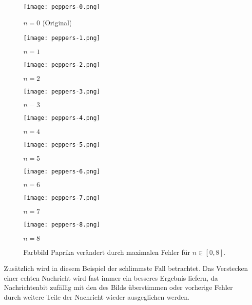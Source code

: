 \begin{figure}[h!]
  \centering
  \begin{minipage}[t]{0.3\textwidth}
    \texttt{[image: peppers-0.png]}
    \caption*{$n = 0$ (Original)}
  \end{minipage}
  \hfill
  \begin{minipage}[t]{0.3\textwidth}
    \texttt{[image: peppers-1.png]}
    \caption*{$n = 1$}
  \end{minipage}
  \hfill
  \begin{minipage}[t]{0.3\textwidth}
    \texttt{[image: peppers-2.png]}
    \caption*{$n = 2$}
  \end{minipage}%
  \vspace{0.5cm}
  \begin{minipage}[t]{0.3\textwidth}
    \texttt{[image: peppers-3.png]}
    \caption*{$n = 3$}
  \end{minipage}
  \hfill
  \begin{minipage}[t]{0.3\textwidth}
    \texttt{[image: peppers-4.png]}
    \caption*{$n = 4$}
  \end{minipage}
  \hfill
  \begin{minipage}[t]{0.3\textwidth}
    \texttt{[image: peppers-5.png]}
    \caption*{$n = 5$}
  \end{minipage}%
  \vspace{0.5cm}
  \begin{minipage}[t]{0.3\textwidth}
    \texttt{[image: peppers-6.png]}
    \caption*{$n = 6$}
  \end{minipage}
  \hfill
  \begin{minipage}[t]{0.3\textwidth}
    \texttt{[image: peppers-7.png]}
    \caption*{$n = 7$}
  \end{minipage}
  \hfill
  \begin{minipage}[t]{0.3\textwidth}
    \texttt{[image: peppers-8.png]}
    \caption*{$n = 8$}
  \end{minipage}
  \caption{Farbbild Paprika verändert durch maximalen Fehler für $n \in [0,8]$.}
  \label{fig:peppers}
\end{figure}
\noindent
Zusätzlich wird in diesem Beispiel der schlimmste Fall betrachtet.
Das Verstecken einer echten Nachricht wird fast immer
ein besseres Ergebnis liefern, da Nachrichtenbit
zufällig mit den des Bilds überstimmen oder vorherige Fehler
durch weitere Teile der Nachricht wieder ausgeglichen werden.

